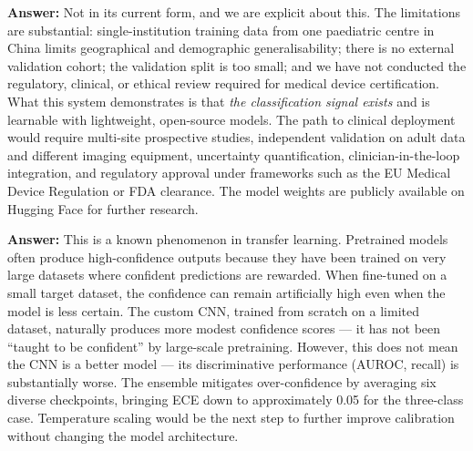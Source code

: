 \documentclass[12pt,a4paper]{article}
\begin{document}
\begin{tcolorbox}[qabox={Q7 — Could this system work in a real clinical setting?}]
\textbf{Answer:} Not in its current form, and we are explicit about this. The limitations are substantial: single-institution training data from one paediatric centre in China limits geographical and demographic generalisability; there is no external validation cohort; the validation split is too small; and we have not conducted the regulatory, clinical, or ethical review required for medical device certification. What this system demonstrates is that \emph{the classification signal exists} and is learnable with lightweight, open-source models. The path to clinical deployment would require multi-site prospective studies, independent validation on adult data and different imaging equipment, uncertainty quantification, clinician-in-the-loop integration, and regulatory approval under frameworks such as the EU Medical Device Regulation or FDA clearance. The model weights are publicly available on Hugging Face for further research.
\end{tcolorbox}

\begin{tcolorbox}[qabox={Q8 — Why do the transfer learning models have higher ECE (worse calibration) than the custom CNN?}]
\textbf{Answer:} This is a known phenomenon in transfer learning. Pretrained models often produce high-confidence outputs because they have been trained on very large datasets where confident predictions are rewarded. When fine-tuned on a small target dataset, the confidence can remain artificially high even when the model is less certain. The custom CNN, trained from scratch on a limited dataset, naturally produces more modest confidence scores --- it has not been ``taught to be confident'' by large-scale pretraining. However, this does not mean the CNN is a better model --- its discriminative performance (AUROC, recall) is substantially worse. The ensemble mitigates over-confidence by averaging six diverse checkpoints, bringing ECE down to approximately 0.05 for the three-class case. Temperature scaling would be the next step to further improve calibration without changing the model architecture.
\end{tcolorbox}
\end{document}
